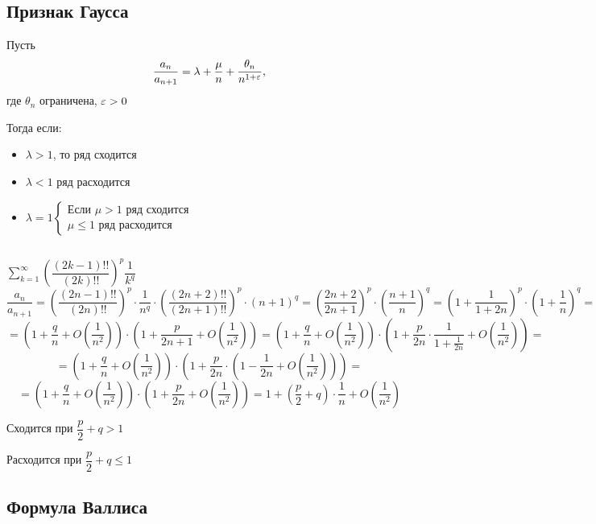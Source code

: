 \documentclass[../../main.tex]{subfiles}
\begin{document}
\subsection{Признак Гаусса}

Пусть \[\dfrac{a_n}{a_{n+1}} = \lambda + \dfrac{\mu}{n} +
\dfrac{\theta_n}{n^{1 + \varepsilon}},\]
где $\theta_n $ ограничена, $\varepsilon > 0$

Тогда если:
\begin{itemize}
	 \item[] $\lambda > 1$, то ряд сходится
	 \item[] $\lambda < 1$ ряд расходится
	 \item[] $\lambda = 1
	 \begin{cases}
	 	\text{Если } \mu > 1 \text{ ряд сходится}\\
	 	\mu \leq 1 \text{ ряд расходится} 
	 \end{cases}$
\end{itemize}

\begin{example}
$ $

$\sum\limits_{k = 1}^{\infty}\left(\dfrac{(2k - 1)!!}{(2k)!!} \right)^p
\dfrac{1}{k^q}$
\[
\dfrac{a_{n}}{a_{n + 1}} = \left(\dfrac{(2n - 1)!!}{(2n)!!}\right)^p \cdot
\dfrac{1}{n^q} \cdot\left( \dfrac{(2n + 2)!!}{(2n + 1)!!}\right)^p \cdot
(n + 1)^q = \left(\dfrac{2n + 2}{2n + 1}\right)^p \cdot
\left(\dfrac{n+1}{n}\right)^q = \left(1 + \dfrac{1}{1 + 2n}\right)^p \cdot
\left(1 + \dfrac{1}{n}\right)^q =
\]
\[
= \left(1 + \dfrac{q}{n} + O\left(\dfrac{1}{n^2}\right)\right) \cdot
\left(1 + \dfrac{p}{2n + 1} + O\left(\dfrac{1}{n^2}\right)\right) =
\left(1 + \dfrac{q}{n} + O\left(\dfrac{1}{n^2}\right)\right) \cdot
\left(1 + \dfrac{p}{2n} \cdot \dfrac{1}{1 + \frac{1}{2n}}
+ O\left(\dfrac{1}{n^2}\right)\right) =
\]
\[
= \left(1 + \dfrac{q}{n} + O\left(\dfrac{1}{n^2}\right)\right) \cdot \left(1 +
\dfrac{p}{2n} \cdot \left(1 - \dfrac{1}{2n} + O\left(\dfrac{1}{n^2}
\right)\right)\right) =
\]
\[
= \left(1 + \dfrac{q}{n} + O\left(\dfrac{1}{n^2}\right)\right) \cdot \left(1 +
\dfrac{p}{2n} + O\left(\dfrac{1}{n^2}\right)\right) = 1 + \left(\dfrac{p}{2} +
q \right) \cdot \dfrac{1}{n} + O\left(\dfrac{1}{n^2}\right)
\]

Сходится при $\dfrac{p}{2} + q > 1$

Расходится при $\dfrac{p}{2} + q \leq 1$ 
\end{example}

\subsection{Формула Валлиса}
\end{document}
